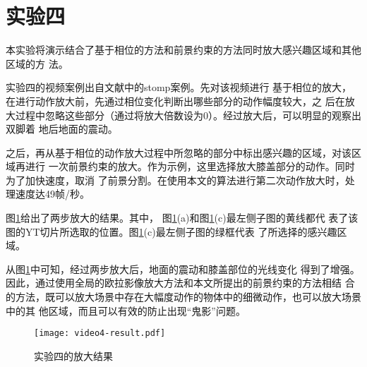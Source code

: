 \section{实验四}
\label{sec:exam-stomp}

本实验将演示结合了基于相位的方法和前景约束的方法同时放大感兴趣区域和其他区域的方
法。

实验四的视频案例出自文献\cite{Wadhwa2013PhaseBased}中的stomp案例。先对该视频进行
基于相位的放大，在进行动作放大前，先通过相位变化判断出哪些部分的动作幅度较大，之
后在放大过程中忽略这些部分（通过将放大倍数设为0）。经过放大后，可以明显的观察出双脚着
地后地面的震动。

之后，再从基于相位的动作放大过程中所忽略的部分中标出感兴趣的区域，对该区域再进行
一次前景约束的放大。作为示例，这里选择放大膝盖部分的动作。同时为了加快速度，取消
了前景分割。在使用本文的算法进行第二次动作放大时，处理速度达49帧/秒。

图\ref{fig:exam4-result}给出了两步放大的结果。其中，
图\ref{fig:exam4-result}(a)和图\ref{fig:exam4-result}(c)最左侧子图的黄线都代
表了该图的YT切片所选取的位置。图\ref{fig:exam4-result}(c)最左侧子图的绿框代表
了所选择的感兴趣区域。

从图\ref{fig:exam4-result}中可知，经过两步放大后，地面的震动和膝盖部位的光线变化
得到了增强。因此，通过使用全局的欧拉影像放大方法和本文所提出的前景约束的方法相结
合的方法，既可以放大场景中存在大幅度动作的物体中的细微动作，也可以放大场景中的其
他区域，而且可以有效的防止出现“鬼影”问题。

\clearpage


\begin{figure}[htbp]
  \centering
  \texttt{[image: video4-result.pdf]}
  \caption{实验四的放大结果}
  \label{fig:exam4-result}
\end{figure}

